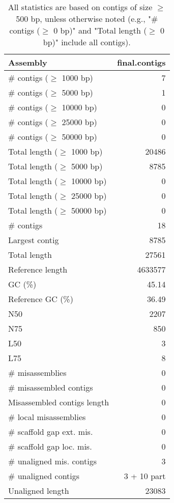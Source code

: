 \documentclass[12pt,a4paper]{article}
\begin{document}
\begin{table}[ht]
\begin{center}
\caption{All statistics are based on contigs of size $\geq$ 500 bp, unless otherwise noted (e.g., "\# contigs ($\geq$ 0 bp)" and "Total length ($\geq$ 0 bp)" include all contigs).}
\begin{tabular}{|l*{1}{|r}|}
\hline
Assembly & final.contigs \\ \hline
\# contigs ($\geq$ 1000 bp) & 7 \\ \hline
\# contigs ($\geq$ 5000 bp) & 1 \\ \hline
\# contigs ($\geq$ 10000 bp) & 0 \\ \hline
\# contigs ($\geq$ 25000 bp) & 0 \\ \hline
\# contigs ($\geq$ 50000 bp) & 0 \\ \hline
Total length ($\geq$ 1000 bp) & 20486 \\ \hline
Total length ($\geq$ 5000 bp) & 8785 \\ \hline
Total length ($\geq$ 10000 bp) & 0 \\ \hline
Total length ($\geq$ 25000 bp) & 0 \\ \hline
Total length ($\geq$ 50000 bp) & 0 \\ \hline
\# contigs & 18 \\ \hline
Largest contig & 8785 \\ \hline
Total length & 27561 \\ \hline
Reference length & 4633577 \\ \hline
GC (\%) & 45.14 \\ \hline
Reference GC (\%) & 36.49 \\ \hline
N50 & 2207 \\ \hline
N75 & 850 \\ \hline
L50 & 3 \\ \hline
L75 & 8 \\ \hline
\# misassemblies & 0 \\ \hline
\# misassembled contigs & 0 \\ \hline
Misassembled contigs length & 0 \\ \hline
\# local misassemblies & 0 \\ \hline
\# scaffold gap ext. mis. & 0 \\ \hline
\# scaffold gap loc. mis. & 0 \\ \hline
\# unaligned mis. contigs & 3 \\ \hline
\# unaligned contigs & 3 + 10 part \\ \hline
Unaligned length & 23083 \\ \hline

\end{tabular}
\end{center}
\end{table}
\end{document}
